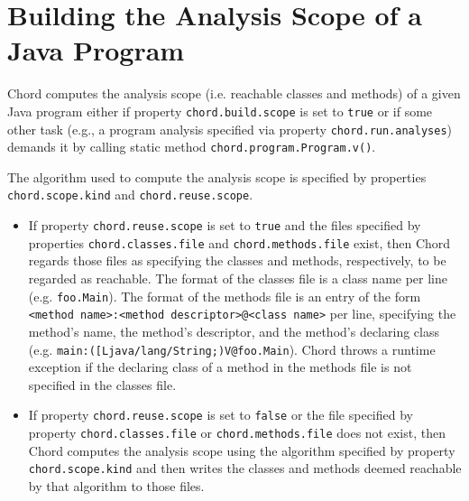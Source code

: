 \section{Building the Analysis Scope of a Java Program}
\label{sec:building-scope}

Chord computes the analysis scope (i.e. reachable classes and methods) of a given Java program
either if property \verb+chord.build.scope+ is set to \verb+true+ or if some other task (e.g.,
a program analysis specified via property \verb+chord.run.analyses+) demands it by
calling static method \verb+chord.program.Program.v()+.

The algorithm used to compute the analysis scope is specified by 
properties \verb+chord.scope.kind+ and \verb+chord.reuse.scope+.

\begin{itemize}
\item
If property \verb+chord.reuse.scope+ is set to \verb+true+ and the files specified by
properties \verb+chord.classes.file+ and \verb+chord.methods.file+ exist,
then Chord regards those files as specifying the classes and methods, respectively,
to be regarded as reachable.  The format
of the classes file is a class name per line (e.g. \verb+foo.Main+).  The format
of the methods file is an entry of the form \verb+<method name>:<method descriptor>@<class name>+ per line,
specifying the method's name, the method's descriptor, and the method's declaring class
(e.g. \verb+main:([Ljava/lang/String;)V@foo.Main+).
Chord throws a runtime exception if the declaring class of a method in the methods file is not
specified in the classes file.
\item
If property \verb+chord.reuse.scope+ is set to \verb+false+ or the file specified by
property \verb+chord.classes.file+ or \verb+chord.methods.file+ does not exist,
then Chord computes the analysis scope
using the algorithm specified by property \verb+chord.scope.kind+ and then
writes the classes and methods deemed reachable by that algorithm to those files.


\end{itemize}
